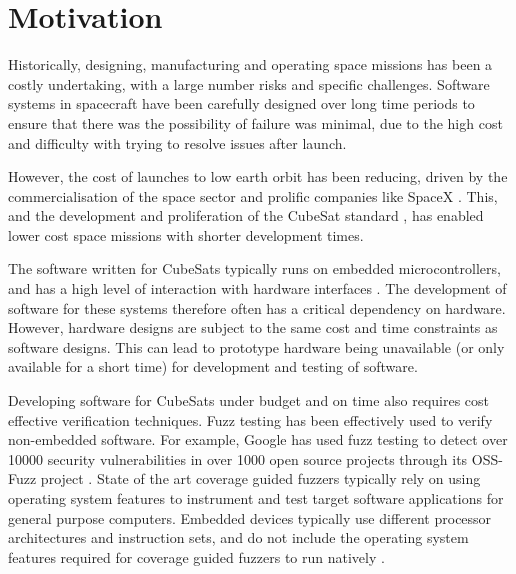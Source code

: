 \documentclass[../report.tex]{subfiles}
\begin{document}
\section{Motivation} \label{sec:motivation}



Historically, designing, manufacturing and operating space missions has been a
costly undertaking, with a large number risks and specific challenges. Software
systems in spacecraft have been carefully designed over long time periods to
ensure that there was the possibility of failure was minimal, due to the high
cost and difficulty with trying to resolve issues after launch.

However, the cost of launches to low earth orbit has been reducing, driven by
the commercialisation of the space sector and prolific companies like SpaceX
\citep{Denis_2020}. This, and the development and proliferation of the CubeSat
standard \citep{CubesatDesignSpec}, has enabled lower cost space missions with
shorter development times.

The software written for CubeSats typically runs on embedded microcontrollers,
and has a high level of interaction with hardware interfaces
\citep{Cratere_2024}. The development of software for these systems therefore
often has a critical dependency on hardware. However, hardware designs are
subject to the same cost and time constraints as software designs. This can
lead to prototype hardware being unavailable (or only available for a short
time) for development and testing of software.

Developing software for CubeSats under budget and on time also requires cost
effective verification techniques. Fuzz testing has been effectively used to
verify non-embedded software. For example, Google has used fuzz testing to
detect over 10000 security vulnerabilities in over 1000 open source projects
through its OSS-Fuzz project \citep{Google_2023}. State of the art coverage
guided fuzzers typically rely on using operating system features to instrument
and test target software applications for general purpose computers. Embedded
devices typically use different processor architectures and instruction sets,
and do not include the operating system features required for coverage guided
fuzzers to run natively \citep{Muench_2018}.
\end{document}
